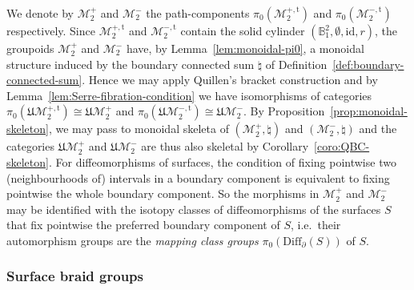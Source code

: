 \documentclass[AHL,Unicode,published]{cedram}
\newcommand{\Diff}{\mathrm{Diff}}
\newcommand{\id}{\mathrm{id}}
\newcommand{\mt}{\mathrm{t}}
\newcommand{\fU}{\ensuremath{\mathfrak{U}}}
\newcommand{\cM}{\mathcal{M}}
\newcommand{\bB}{\mathbb{B}}
\begin{document}
We denote by $\cM_{2}^{+}$ and $\cM_{2}^{-}$ the path-components $\pi_{0}(\cM_{2}^{+,\mt})$ and $\pi_{0}(\cM_{2}^{-,\mt})$ respectively. Since $\cM_{2}^{+,\mt}$ and $\cM_{2}^{-,\mt}$ contain the solid cylinder $(\bB^2_{1},\emptyset,\id,r)$, the groupoids $\cM_{2}^{+}$ and $\cM_{2}^{-}$ have, by Lemma~\ref{lem:monoidal-pi0}, a monoidal structure induced by the boundary connected sum $\natural$ of Definition~\ref{def:boundary-connected-sum}. Hence we may apply Quillen's bracket construction and by Lemma~\ref{lem:Serre-fibration-condition} we have isomorphisms of categories $\pi_{0}(\fU\cM_{2}^{+,\mt}) \cong \fU\cM_{2}^{+}$ and $\pi_{0}(\fU\cM_{2}^{-,\mt}) \cong \fU\cM_{2}^{-}$. By Proposition~\ref{prop:monoidal-skeleton}, we may pass to monoidal skeleta of $(\cM_{2}^{+},\natural)$ and $(\cM_{2}^{-},\natural)$ and the categories $\fU\cM_{2}^{+}$ and $\fU\cM_{2}^{-}$ are thus also skeletal by Corollary~\ref{coro:QBC-skeleton}. For diffeomorphisms of surfaces, the condition of fixing pointwise two (neighbourhoods of) intervals in a boundary component is equivalent to fixing pointwise the whole boundary component. So the morphisms in $\cM_{2}^{+}$ and $\cM_{2}^{-}$ may be identified with the isotopy classes of diffeomorphisms of the surfaces $S$ that fix pointwise the preferred boundary component of $S$, i.e.~their automorphism groups are the
\emph{mapping class groups} $\pi_{0}(\Diff_{\partial}(S))$ of $S$.


\subsubsection{Surface braid groups}\label{sss:category_surface_braid_groups}
\end{document}
